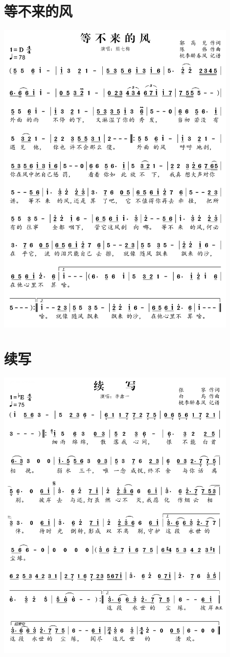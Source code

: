 \documentclass[cn,pad,twocol]{elegantbook}
\begin{document}
\section{等不来的风} \includegraphics[width=0.9\textwidth]{rpi400/20210212等不来的风.png}
\section{续写} \includegraphics[width=0.9\textwidth]{rpi400/20210212续写.png}
\end{document}
